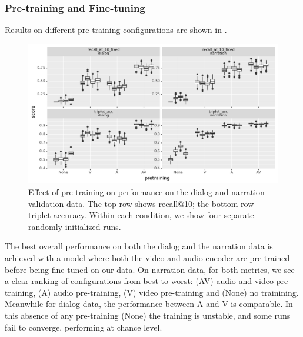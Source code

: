 \subsubsection{Pre-training and Fine-tuning}
Results on different pre-training configurations are shown in
.
\begin{figure}[htb]
	\centering
	\includegraphics[width=\textwidth]{results/ablations/pretraining.pdf}
	\caption{Effect of pre-training on performance on the dialog
          and narration validation data. The top row shows recall@10;
          the bottom row triplet accuracy. Within each condition, we
          show four separate randomly initialized runs.}
	\label{fig:pretraining}
      \end{figure}

The best overall performance on both the dialog and the narration data is 
achieved with a model where both the video and audio encoder are pre-trained 
before being fine-tuned on our data. On narration data, for both metrics,
we see a clear ranking of
configurations from best to worst: (AV) audio and video pre-training,
(A) audio pre-training, (V) video pre-training and (None) no
trainining. Meanwhile for dialog data, the performance between A and V
is comparable. In this absence of any pre-training (None) the training is unstable,
and some runs fail to converge, performing at chance level.

